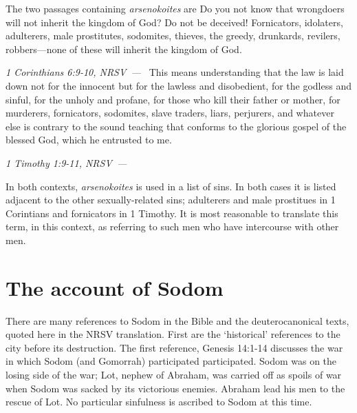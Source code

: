\documentclass[10pt]{article}
\let\oldquote\quote
\let\endoldquote\endquote
\renewenvironment{quote}[2][]
  {\if\relax\detokenize{#1}\relax
     \def\quoteauthor{#2}%
   \else
     \def\quoteauthor{#2~---~#1}%
   \fi
   \oldquote}
  {\par\nobreak\smallskip\hfill\textit{\quoteauthor}%
   \endoldquote\addvspace{\bigskipamount}}
\begin{document}
The two passages containing \textit{arsenokoites} are 
\begin{quote}{1 Corinthians 6:9-10, NRSV}
Do you not know that wrongdoers will not inherit the kingdom of God? Do not be deceived! Fornicators, idolaters, adulterers, male prostitutes, sodomites, thieves, the greedy, drunkards, revilers, robbers—none of these will inherit the kingdom of God. 
\end{quote}
\begin{quote}{1 Timothy 1:9-11, NRSV}
This means understanding that the law is laid down not for the innocent but for the lawless and disobedient, for the godless and sinful, for the unholy and profane, for those who kill their father or mother, for murderers, fornicators, sodomites, slave traders, liars, perjurers, and whatever else is contrary to the sound teaching that conforms to the glorious gospel of the blessed God, which he entrusted to me.
\end{quote}

In both contexts, \textit{arsenokoites} is used in a list of sins. In both cases it is listed adjacent to the other sexually-related sins; adulterers and male prostitues in 1 Corintians and fornicators in 1 Timothy. It is most reasonable to translate this term, in this context, as referring to such men who have intercourse with other men. 

\section*{The account of Sodom}

There are many references to Sodom in the Bible and the deuterocanonical texts, quoted here in the NRSV translation. First are the `historical' references to the city before its destruction. The first reference, Genesis 14:1-14 discusses the war in which Sodom (and Gomorrah) participated participated. Sodom was on the losing side of the war; Lot, nephew of Abraham, was carried off as spoils of war when Sodom was sacked by its victorious enemies. Abraham lead his men to the rescue of Lot. No particular sinfulness is ascribed to Sodom at this time. 
\end{document}
